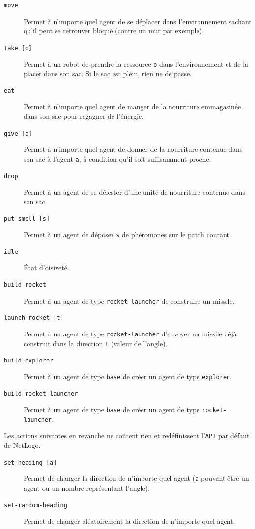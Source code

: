 \documentclass[a4paper,11pt]{article}
\begin{document}
\begin{description}
  \item[\texttt{move}] Permet à n'importe quel agent de se déplacer dans l'environnement sachant
    qu'il peut se retrouver bloqué (contre un mur par exemple).
  \item[\texttt{take [o]}] Permet à un robot de prendre la ressource \texttt{o} dans
    l'environnement et de la placer dans son sac. Si le sac est plein, rien ne de passe.
  \item[\texttt{eat}] Permet à n'importe quel agent de manger de la nourriture emmagasinée dans son
    sac pour regagner de l'énergie.
  \item[\texttt{give [a]}] Permet à n'importe quel agent de donner de la nourriture contenue dans
    son sac à l'agent \texttt{a}, à condition qu'il soit suffisamment proche.
  \item[\texttt{drop}] Permet à un agent de se délester d'une unité de nourriture contenue dans son
    sac.
  \item[\texttt{put-smell [s]}] Permet à un agent de déposer \texttt{s} de phéromones sur le patch
    courant.
  \item[\texttt{idle}] État d'oisiveté.
  \item[\texttt{build-rocket}] Permet à un agent de type \texttt{rocket-launcher} de construire un
    missile.
  \item[\texttt{launch-rocket [t]}] Permet à un agent de type \texttt{rocket-launcher} d'envoyer un
    missile déjà construit dans la direction \texttt{t} (valeur de l'angle).
  \item[\texttt{build-explorer}] Permet à un agent de type \texttt{base} de créer un agent de type
    \texttt{explorer}.
  \item[\texttt{build-rocket-launcher}] Permet à un agent de type \texttt{base} de créer un agent de
    type \texttt{rocket-launcher}.\\
\end{description}

Les actions suivantes en revanche ne coûtent rien et redéfinissent l'\texttt{API} par défaut de
NetLogo.

\begin{description}
  \item[\texttt{set-heading [a]}] Permet de changer la direction de n'importe quel agent (\texttt{a}
    pouvant être un agent ou un nombre représentant l'angle).
  \item[\texttt{set-random-heading}] Permet de changer aléatoirement la direction de n'importe quel
    agent.
\end{description}
\end{document}
